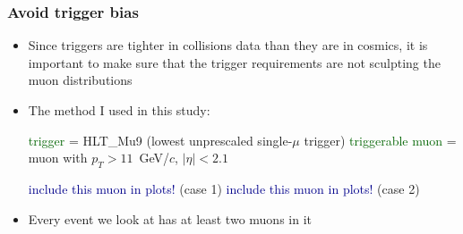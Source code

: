 \documentclass[compress]{beamer}
\begin{document}
\begin{frame}
\frametitle{Avoid trigger bias}
\begin{itemize}
\item Since triggers are tighter in collisions data than they are in
  cosmics, it is important to make sure that the trigger requirements
  are not sculpting the muon distributions
\item The method I used in this study:

\begin{algorithmic}
\STATE \textcolor{darkgreen}{trigger} = HLT\_Mu9 (lowest unprescaled single-$\mu$ trigger)
\STATE \textcolor{darkgreen}{triggerable muon} = muon with $p_T > 11$~GeV/$c$, $|\eta| < 2.1$

\vspace{0.2 cm}
\STATE \textcolor{darkblue}{include this muon in plots!} (case 1)
\STATE \textcolor{darkblue}{include this muon in plots!} (case 2)
\ENDIF
\ENDFOR
\ENDIF
\end{algorithmic}

\item Every event we look at has at least two muons in it
\end{itemize}
\end{frame}
\end{document}
